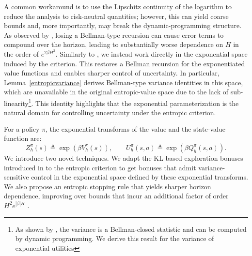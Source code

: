 \documentclass[final,12pt]{colt2026} %
\begin{document}
A common workaround is to use the Lipschitz continuity of the logarithm to reduce the analysis to risk-neutral quantities; however, this can yield coarse bounds and, more importantly, may break the dynamic-programming structure. As observed by \citet{FeiYCW21}, losing a Bellman-type recursion can cause error terms to compound over the horizon, leading to substantially worse dependence on $H$ in the order of $e^{2\beta H^2}$. Similarly to \citet{FeiYCW21}, we instead work directly in the exponential space induced by the criterion. This restores a Bellman recursion for the exponentiated value functions and enables sharper control of uncertainty. In particular, Lemma~\ref{entropicvariance} derives Bellman-type variance identities in this space, which are unavailable in the original entropic-value
space due to the lack of sub-linearity\footnote{As shown by \citet{rowland2019statistics}, the variance is a Bellman-closed statistic and can be computed by dynamic programming. We derive this result for the variance of exponential utilities}. This identity highlights that the exponential parameterization is the natural domain for controlling uncertainty under the entropic criterion.

For a policy $\pi$, the exponential transforms of the value and the state-value function are:
$$
Z_h^\pi(s) \triangleq \exp(\beta V_h^\pi(s)),\qquad
U_h^\pi(s,a) \triangleq \exp(\beta Q_h^\pi(s,a)).
$$
We introduce two novel techniques. We adapt the KL-based exploration bonuses introduced in \citep{Menard2021Fast} to the entropic criterion to get bonuses that admit variance-sensitive control in the exponential space defined by these exponential transforms. We also propose an entropic stopping rule that yields sharper horizon dependence, improving over bounds that incur an additional factor of order $H^2e^{|\beta|H}$ \citep{MortensenTalebi2025}.
\end{document}
